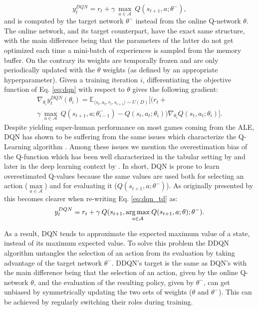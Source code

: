 \begin{equation}
    y^{DQN}_{t} = r_{t} + \gamma \: \underset{a\in \mathcal{A}}{\max}\: Q(s_{t+1}, a; \theta^{-}), 
\label{eq:dqn_td}
\end{equation}{}
and is computed by the target network $\theta^{-}$ instead from the online Q-network $\theta$. 
The online network, and its target counterpart, have the exact same structure, with the main difference being that the parameters of the latter do not get optimized each time a mini-batch of experiences is sampled from the memory buffer. On the contrary its weights are temporally frozen and are only periodically updated with the $\theta$ weights (as defined by an appropriate hyperparameter). Given a training iteration $i$, differentiating the objective function of Eq. \ref{eq:dqn} with respect to $\theta$ gives the following gradient: 
\begin{multline}
\nabla_{\theta_{i}}y^{DQN}_{t}(\theta_{i}) = \mathds{E}_{\langle s_{t},a_{t},r_{t},s_{t+1}\rangle\sim U(D)} \bigg[\big(r_{t} + \\ \gamma \: \underset{a\in \mathcal{A}}{\max}\: Q(s_{t+1}, a; \theta^{-}_{i-1})  - Q(s_{t}, a_{t}; \theta_{i})\big)\nabla_{\theta_{i}} Q(s_{t}, a_{t}; \theta_{i})\bigg].
\label{eq:dqn_gradient}
\end{multline}
Despite yielding super-human performance on most games coming from the ALE, DQN has shown to be suffering from the same issues which characterize the Q-Learning algorithm \cite{hasselt2010double}. Among these issues we mention the overestimation bias of the Q-function which has been well characterized in the tabular setting by \citet{hasselt2010double} and later in the deep learning context by \citet{van2016deep}.
In short, DQN is prone to learn overestimated Q-values because the same values are used both for selecting an action ($\underset{a\in \mathcal{A}}{\max}$) and for evaluating it ($Q(s_{t+1},a;\theta^{-})$). As originally presented by \citet{van2016deep} this becomes clearer when re-writing Eq. \ref{eq:dqn_td} as:
\begin{equation}
    y^{DQN}_{t} = r_{t} + \gamma \: Q(s_{t+1}, \underset{a\in \mathcal{A}}{\operatorname*{arg\,max}}\: Q(s_{t+1}, a; \theta); \theta^{-}). 
\end{equation}{}

As a result, DQN tends to approximate the expected maximum value of a state, instead of its maximum expected value. To solve this problem the DDQN algorithm untangles the selection of an action from its evaluation by taking advantage of the target network $\theta^{-}$. DDQN's target is the same as DQN's with the main difference being that the selection of an action, given by the online Q-network $\theta$, and the evaluation of the resulting policy, given by $\theta^{-}$, can get unbiased by symmetrically updating the two sets of weights ($\theta$ and $\theta^{-}$). This can be achieved by regularly switching their roles during training.

